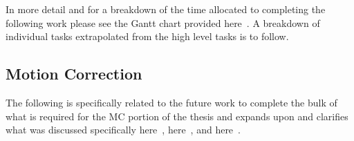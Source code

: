         In more detail and for a breakdown of the time allocated to completing the following work please see the Gantt chart provided here~. A breakdown of individual tasks extrapolated from the high level tasks is to follow.
        
        \subsection{Motion Correction} \label{sec:future_work_motion_correction}
            The following is specifically related to the future work to complete the bulk of what is required for the \gls{MC} portion of the thesis and expands upon and clarifies what was discussed specifically here~, here~, and here~.
            
